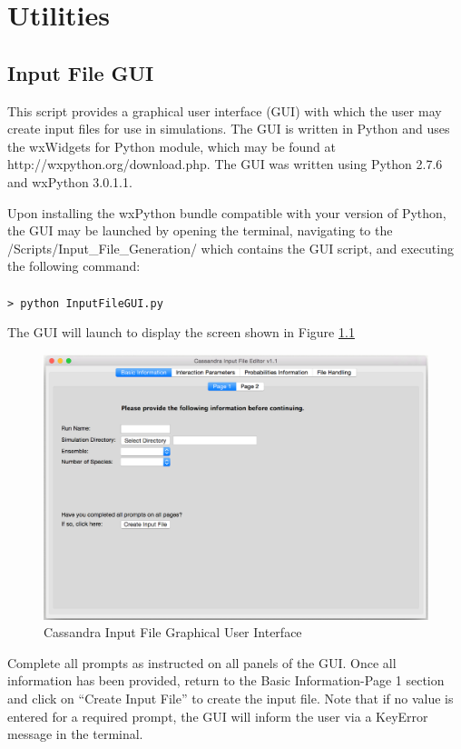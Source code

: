\chapter{Utilities}

\section{Input File GUI} 
\label{sec:GUI}
This script provides a graphical user interface (GUI) with which the user 
may create input files for use in simulations.  The GUI is written 
in Python and uses the wxWidgets for Python module, which may be found at
http://wxpython.org/download.php. The GUI was written using 
Python 2.7.6 and wxPython 3.0.1.1.

Upon installing the wxPython bundle compatible with your version of 
Python, the GUI may be launched by opening
the terminal, navigating to the /Scripts/Input\_File\_Generation/
which contains the GUI script, and executing the following command:  \\ \\
%
\texttt{> python InputFileGUI.py}
%

The GUI will launch to display the screen shown in Figure \ref{fig:GUIscreenshot}

\begin{figure}[h]
 \centering
 \includegraphics[width=\textwidth]{GUI_screenshot.eps}
 \caption{Cassandra Input File Graphical User Interface}
 \label{fig:GUIscreenshot}
\end{figure}

Complete all prompts as instructed on all panels of the GUI. 
Once all information has been provided, return to the Basic Information-Page 1 
section and click on ``Create Input File'' to create the input file. Note that if no 
value is entered for a required prompt, the GUI will inform the user 
via a KeyError message in the terminal.

